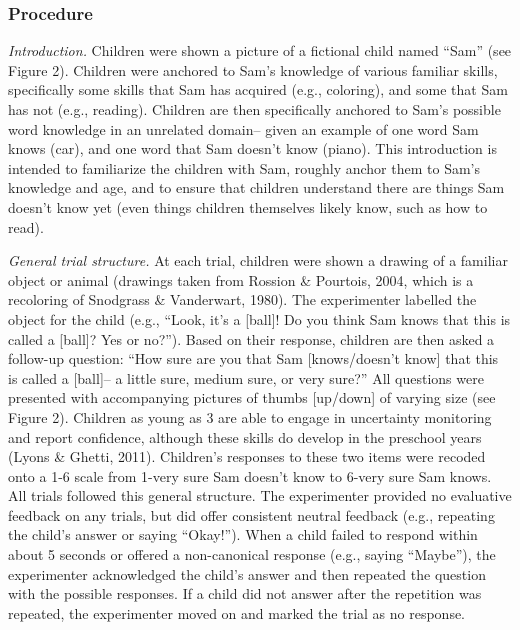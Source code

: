 \documentclass[10pt, letterpaper]{article}
\begin{document}
\hypertarget{procedure}{%
\subsubsection{Procedure}\label{procedure}}

\emph{Introduction.} Children were shown a picture of a fictional child
named ``Sam'' (see Figure 2). Children were anchored to Sam's knowledge
of various familiar skills, specifically some skills that Sam has
acquired (e.g., coloring), and some that Sam has not (e.g., reading).
Children are then specifically anchored to Sam's possible word knowledge
in an unrelated domain-- given an example of one word Sam knows (car),
and one word that Sam doesn't know (piano). This introduction is
intended to familiarize the children with Sam, roughly anchor them to
Sam's knowledge and age, and to ensure that children understand there
are things Sam doesn't know yet (even things children themselves likely
know, such as how to read).

\emph{General trial structure.} At each trial, children were shown a
drawing of a familiar object or animal (drawings taken from Rossion \&
Pourtois, 2004, which is a recoloring of Snodgrass \& Vanderwart, 1980).
The experimenter labelled the object for the child (e.g., ``Look, it's a
{[}ball{]}! Do you think Sam knows that this is called a {[}ball{]}? Yes
or no?''). Based on their response, children are then asked a follow-up
question: ``How sure are you that Sam {[}knows/doesn't know{]} that this
is called a {[}ball{]}-- a little sure, medium sure, or very sure?'' All
questions were presented with accompanying pictures of thumbs
{[}up/down{]} of varying size (see Figure 2). Children as young as 3 are
able to engage in uncertainty monitoring and report confidence, although
these skills do develop in the preschool years (Lyons \& Ghetti, 2011).
Children's responses to these two items were recoded onto a 1-6 scale
from 1-very sure Sam doesn't know to 6-very sure Sam knows. All trials
followed this general structure. The experimenter provided no evaluative
feedback on any trials, but did offer consistent neutral feedback (e.g.,
repeating the child's answer or saying ``Okay!''). When a child failed
to respond within about 5 seconds or offered a non-canonical response
(e.g., saying ``Maybe''), the experimenter acknowledged the child's
answer and then repeated the question with the possible responses. If a
child did not answer after the repetition was repeated, the experimenter
moved on and marked the trial as no response.
\end{document}
